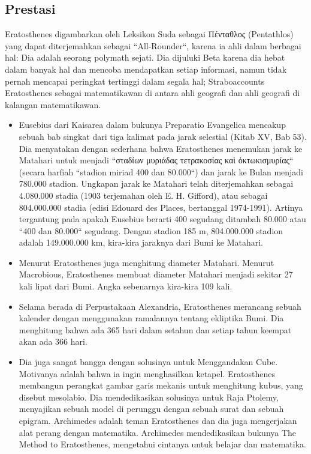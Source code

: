 \subsection{Prestasi}
Eratosthenes digambarkan oleh Leksikon Suda sebagai Πένταθλος (Pentathlos) yang dapat diterjemahkan sebagai ``All-Rounder``, karena ia ahli dalam berbagai hal: Dia adalah seorang polymath sejati. Dia dijuluki Beta karena dia hebat dalam banyak hal dan mencoba mendapatkan setiap informasi, namun tidak pernah mencapai peringkat tertinggi dalam segala hal; Straboaccounts Eratosthenes sebagai matematikawan di antara ahli geografi dan ahli geografi di kalangan matematikawan.
\begin{itemize}
 
\item Eusebius dari Kaisarea dalam bukunya Preparatio Evangelica mencakup sebuah bab singkat dari tiga kalimat pada jarak selestial (Kitab XV, Bab 53). Dia menyatakan dengan sederhana bahwa Eratosthenes menemukan jarak ke Matahari untuk menjadi ``σταδίων μυριάδας τετρακοσίας καὶ ὀκτωκισμυρίας`` (secara harfiah 	``stadion miriad 400 dan 80.000``) dan jarak ke Bulan menjadi 780.000 stadion. Ungkapan jarak ke Matahari telah diterjemahkan sebagai 4.080.000 stadia (1903 terjemahan oleh E. H. Gifford), atau sebagai 804.000.000 stadia (edisi Edouard des Places, bertanggal 1974-1991). Artinya tergantung pada apakah Eusebius berarti 400 segudang ditambah 80.000 atau ``400 dan 80.000`` segudang. Dengan stadion 185 m, 804.000.000 stadion adalah 149.000.000 km, kira-kira jaraknya dari Bumi ke Matahari.
\item Menurut \cite{smith2005dictionary} Eratosthenes juga menghitung diameter Matahari. Menurut Macrobious, Eratosthenes membuat diameter Matahari menjadi sekitar 27 kali lipat dari Bumi. Angka sebenarnya kira-kira 109 kali.
\item Selama berada di Perpustakaan Alexandria, Eratosthenes merancang sebuah kalender dengan menggunakan ramalannya tentang ekliptika Bumi. Dia menghitung bahwa ada 365 hari dalam setahun dan setiap tahun keempat akan ada 366 hari.
\item Dia juga sangat bangga dengan solusinya untuk Menggandakan Cube. Motivanya adalah bahwa ia ingin menghasilkan ketapel. Eratosthenes membangun perangkat gambar garis mekanis untuk menghitung kubus, yang disebut mesolabio. Dia mendedikasikan solusinya untuk Raja Ptolemy, menyajikan sebuah model di perunggu dengan sebuah surat dan sebuah epigram. Archimedes adalah teman Eratosthenes dan dia juga mengerjakan alat perang dengan matematika. Archimedes mendedikasikan bukunya The Method to Eratosthenes, mengetahui cintanya untuk belajar dan matematika. \cite{chondros2010archimedes}
\end{itemize}
